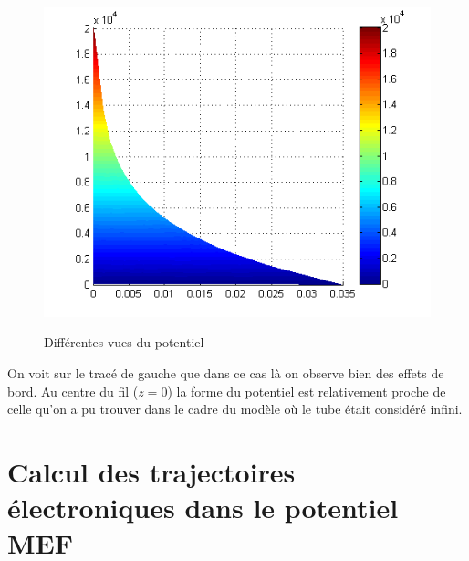 \documentclass[a4paper,12pt]{article}
\begin{document}
\begin{figure}[h]
\begin{minipage}[c]{.32\linewidth}
      \includegraphics[width=1\textwidth,height=0.8\textwidth]{images/v_yz}
      \label{f v_yz}
   \end{minipage}
   \caption{Différentes vues du potentiel}
   \label{f v}
\end{figure}
On voit sur le tracé de gauche que dans ce cas là on observe bien des effets de bord. Au centre du fil ($z=0$) la forme du potentiel est relativement proche de celle qu'on a pu trouver dans le cadre du modèle où le tube était considéré infini.







\section{Calcul des trajectoires électroniques dans le potentiel MEF}
\end{document}
